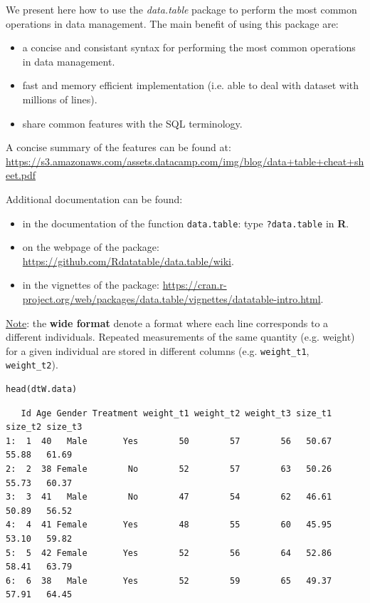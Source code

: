 \documentclass{article}
\newcommand\Rlogo{\textbf{\textsf{R}}\xspace}
\begin{document}
\bigskip

We present here how to use the \emph{data.table} package to perform the
most common operations in data management. The main benefit of using
this package are:
\begin{itemize}
\item a concise and consistant syntax for performing the most common
operations in data management.
\item fast and memory efficient implementation (i.e. able to deal with
dataset with millions of lines).
\item share common features with the SQL terminology.
\end{itemize}
A concise summary of the features can be found at:
\url{https://s3.amazonaws.com/assets.datacamp.com/img/blog/data+table+cheat+sheet.pdf}

\bigskip

Additional documentation can be found:
\begin{itemize}
\item in the documentation of the function \texttt{data.table}: type \texttt{?data.table} in \Rlogo.
\item on the webpage of the package: \url{https://github.com/Rdatatable/data.table/wiki}.
\item in the vignettes of the package: \url{https://cran.r-project.org/web/packages/data.table/vignettes/datatable-intro.html}.
\end{itemize}

\bigskip

\uline{Note}: the \textbf{wide format} denote a format where each line corresponds
to a different individuals. Repeated measurements of the same quantity
(e.g. weight) for a given individual are stored in different columns
(e.g. \texttt{weight\_t1}, \texttt{weight\_t2}).

\lstset{language=r,label= ,caption= ,captionpos=b,numbers=none}
\begin{lstlisting}
head(dtW.data)
\end{lstlisting}

\begin{verbatim}
   Id Age Gender Treatment weight_t1 weight_t2 weight_t3 size_t1 size_t2 size_t3
1:  1  40   Male       Yes        50        57        56   50.67   55.88   61.69
2:  2  38 Female        No        52        57        63   50.26   55.73   60.37
3:  3  41   Male        No        47        54        62   46.61   50.89   56.52
4:  4  41 Female       Yes        48        55        60   45.95   53.10   59.82
5:  5  42 Female       Yes        52        56        64   52.86   58.41   63.79
6:  6  38   Male       Yes        52        59        65   49.37   57.91   64.45
\end{verbatim}
\end{document}
